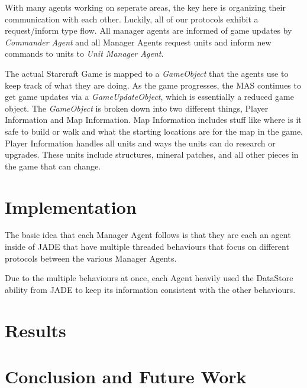 \documentclass[letterpaper]{article}
\begin{document}
With many agents working on seperate areas, the key here is organizing their communication with each other.  Luckily, all of our protocols exhibit a request/inform type flow.  All manager agents are informed of game updates by \emph{Commander Agent} and all Manager Agents request units and inform new commands to units to \emph{Unit Manager Agent}.

The actual Starcraft Game is mapped to a \emph{GameObject} that the agents use to keep track of what they are doing.  As the game progresses, the MAS continues to get game updates via a \emph{GameUpdateObject}, which is essentially a reduced game object.  The \emph{GameObject} is broken down into two different things, Player Information and Map Information. Map Information includes stuff like where is it safe to build or walk and what the starting locations are for the map in the game.  Player Information handles all units and ways the units can do research or upgrades.  These units include structures, mineral patches, and all other pieces in the game that can change.

\section{Implementation}

The basic idea that each Manager Agent follows is that they are each an agent inside of JADE that have multiple threaded behaviours that focus on different protocols between the various Manager Agents.

Due to the multiple behaviours at once, each Agent heavily used the DataStore ability from JADE to keep its information consistent with the other behaviours.

\section{Results}



\section{Conclusion and Future Work}
\end{document}
